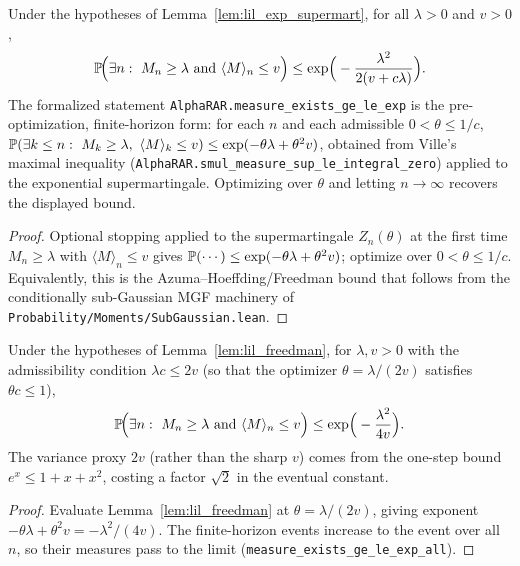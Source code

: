 \begin{lemma}\label{lem:lil_freedman}
Under the hypotheses of Lemma~\ref{lem:lil_exp_supermart}, for all $\lambda > 0$
and $v > 0$,
\[
  \Prob\!\Big(\exists n:\ M_n \ge \lambda \ \text{and}\ \langle M\rangle_n \le v\Big)
  \le \exp\!\Big(-\frac{\lambda^2}{2(v + c\lambda)}\Big).
\]
The formalized statement \texttt{AlphaRAR.measure\_exists\_ge\_le\_exp} is the pre-optimization,
finite-horizon form: for each $n$ and each admissible $0<\theta\le 1/c$,
$\Prob(\exists k\le n:\ M_k\ge\lambda,\ \langle M\rangle_k\le v)\le \exp(-\theta\lambda+\theta^2 v)$,
obtained from Ville's maximal inequality
(\texttt{AlphaRAR.smul\_measure\_sup\_le\_integral\_zero}) applied to the exponential
supermartingale. Optimizing over $\theta$ and letting $n\to\infty$ recovers the displayed bound.
\end{lemma}

\begin{proof}
Optional stopping applied to the supermartingale $Z_n(\theta)$ at the first time
$M_n\ge\lambda$ with $\langle M\rangle_n\le v$ gives
$\mathbb{P}(\cdots)\le \exp(-\theta\lambda + \theta^2 v)$; optimize over
$0<\theta\le 1/c$. Equivalently, this is the Azuma--Hoeffding/Freedman bound that
follows from the conditionally sub-Gaussian MGF machinery of
\texttt{Probability/Moments/SubGaussian.lean}.
\end{proof}

\begin{corollary}\label{cor:lil_freedman_opt}
\leanok
{}
Under the hypotheses of Lemma~\ref{lem:lil_freedman}, for $\lambda, v > 0$ with the
admissibility condition $\lambda c \le 2v$ (so that the optimizer $\theta=\lambda/(2v)$
satisfies $\theta c\le 1$),
\[
  \Prob\!\Big(\exists n:\ M_n \ge \lambda \ \text{and}\ \langle M\rangle_n \le v\Big)
  \le \exp\!\Big(-\frac{\lambda^2}{4v}\Big).
\]
The variance proxy $2v$ (rather than the sharp $v$) comes from the one-step bound
$e^x\le 1+x+x^2$, costing a factor $\sqrt2$ in the eventual constant.
\end{corollary}

\begin{proof}\leanok
{}
Evaluate Lemma~\ref{lem:lil_freedman} at $\theta=\lambda/(2v)$, giving exponent
$-\theta\lambda+\theta^2 v = -\lambda^2/(4v)$. The finite-horizon events increase to the
event over all $n$, so their measures pass to the limit
(\texttt{measure\_exists\_ge\_le\_exp\_all}).
\end{proof}

